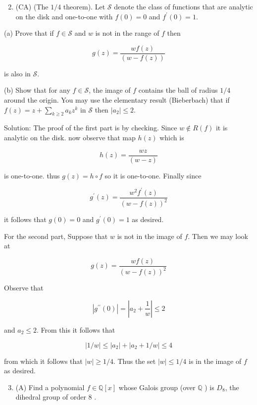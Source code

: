 \documentclass[10pt]{article}
\begin{document}
\begin{enumerate}
  \setcounter{enumi}{1}
  \item (CA) (The $1 / 4$ theorem). Let $\mathcal{S}$ denote the class of functions that are analytic on the disk and one-to-one with $f(0)=0$ and $f^{\prime}(0)=1$.
\end{enumerate}

(a) Prove that if $f \in \mathcal{S}$ and $w$ is not in the range of $f$ then

$$
g(z)=\frac{w f(z)}{(w-f(z))}
$$

is also in $\mathcal{S}$.

(b) Show that for any $f \in \mathcal{S}$, the image of $f$ contains the ball of radius $1 / 4$ around the origin. You may use the elementary result (Bieberbach) that if $f(z)=z+\sum_{k \geq 2} a_{k} z^{k}$ in $\mathcal{S}$ then $\left|a_{2}\right| \leq 2$.

Solution: The proof of the first part is by checking. Since $w \notin R(f)$ it is analytic on the disk. now observe that map $h(z)$ which is

$$
h(z)=\frac{w z}{(w-z)}
$$

is one-to-one. thus $g(z)=h \circ f$ so it is one-to-one. Finally since

$$
g^{\prime}(z)=\frac{w^{2} f^{\prime}(z)}{(w-f(z))^{2}}
$$

it follows that $g(0)=0$ and $g^{\prime}(0)=1$ as desired.

For the second part, Suppose that $w$ is not in the image of $f$. Then we may look at

$$
g(z)=\frac{w f(z)}{(w-f(z))^{2}}
$$

Observe that

$$
\left|g^{\prime \prime}(0)\right|=\left|a_{2}+\frac{1}{w}\right| \leq 2
$$

and $a_{2} \leq 2$. From this it follows that

$$
|1 / w| \leq\left|a_{2}\right|+\left|a_{2}+1 / w\right| \leq 4
$$

from which it follows that $|w| \geq 1 / 4$. Thus the set $|w| \leq 1 / 4$ is in the image of $f$ as desired.

\begin{enumerate}
  \setcounter{enumi}{2}
  \item (A) Find a polynomial $f \in \mathbb{Q}[x]$ whose Galois group (over $\mathbb{Q}$ ) is $D_{8}$, the dihedral group of order 8 .
\end{enumerate}
\end{document}
